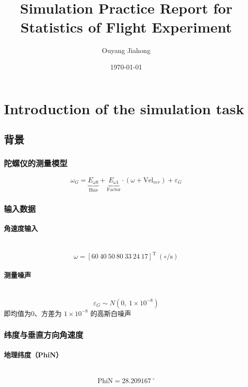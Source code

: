 \documentclass[openany,12pt,UTF8]{ctexart}
\title{Simulation Practice Report for Statistics of Flight Experiment}
\author{Ouyang Jiahong}
\date{\today}
\begin{document}
\maketitle
\newpage
\tableofcontents
\newpage

\section{Introduction of the simulation task}
\subsection{背景}
\subsubsection{陀螺仪的测量模型}
\begin{equation}
    \label{equation:陀螺仪的测量模型}
    \omega_{G} = \underbrace{E_{\omega 0}}_{\text{Bias}} + \underbrace{E_{\omega 1}}_{\text{Factor}} \cdot (\omega + \text{Vel}_{ver}) + \varepsilon_{G}
\end{equation}

\subsubsection{输入数据}
\paragraph{角速度输入}\
\begin{equation}
    \omega = [60\ 40\ 50\ 80\ 33\ 24\ 17]^{\text{T}} \ (\circ/\text{s})
\end{equation}

\paragraph{测量噪声}\
\begin{equation}
    \varepsilon_{G} \sim N(0,\ 1 \times 10^{-8})
\end{equation}
即均值为0、方差为 $1 \times 10^{-8}$ 的高斯白噪声

\subsubsection{纬度与垂直方向角速度}
\paragraph{地理纬度（PhiN）}\
\begin{equation}
    \text{PhiN} = 28.209167\ ^\circ
\end{equation}
\end{document}

